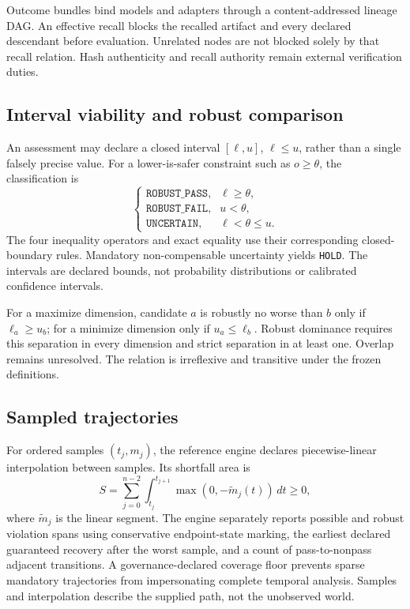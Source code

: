 \documentclass[10pt]{article}
\newcommand{\Hold}{\texttt{HOLD}}
\newcommand{\RPass}{\texttt{ROBUST\_PASS}}
\newcommand{\RFail}{\texttt{ROBUST\_FAIL}}
\newcommand{\Uncertain}{\texttt{UNCERTAIN}}
\begin{document}
Outcome bundles bind models and adapters through a content-addressed lineage
DAG. An effective recall blocks the recalled artifact and every declared
descendant before evaluation. Unrelated nodes are not blocked solely by that
recall relation. Hash authenticity and recall authority remain external
verification duties.

\subsection{Interval viability and robust comparison}

An assessment may declare a closed interval $[\ell,u]$, $\ell\le u$, rather
than a single falsely precise value. For a lower-is-safer constraint such as
$o\ge\theta$, the classification is
\begin{equation}
 \begin{cases}
 \RPass, & \ell\ge\theta,\\
 \RFail, & u<\theta,\\
 \Uncertain, & \ell<\theta\le u.
 \end{cases}
 \label{eq:interval}
\end{equation}
The four inequality operators and exact equality use their corresponding
closed-boundary rules. Mandatory non-compensable uncertainty yields \Hold.
The intervals are declared bounds, not probability distributions or calibrated
confidence intervals.

For a maximize dimension, candidate $a$ is robustly no worse than $b$ only if
$\ell_a\ge u_b$; for a minimize dimension only if $u_a\le\ell_b$. Robust
dominance requires this separation in every dimension and strict separation in
at least one. Overlap remains unresolved. The relation is irreflexive and
transitive under the frozen definitions.

\subsection{Sampled trajectories}

For ordered samples $(t_j,m_j)$, the reference engine declares piecewise-linear
interpolation between samples. Its shortfall area is
\begin{equation}
 S=\sum_{j=0}^{n-2}\int_{t_j}^{t_{j+1}}\max(0,-\widetilde m_j(t))\,dt\ge0,
 \label{eq:shortfall}
\end{equation}
where $\widetilde m_j$ is the linear segment. The engine separately reports
possible and robust violation spans using conservative endpoint-state marking,
the earliest declared guaranteed recovery after the worst sample, and a count
of pass-to-nonpass adjacent transitions. A governance-declared coverage floor
prevents sparse mandatory trajectories from impersonating complete temporal
analysis. Samples and interpolation describe the supplied path, not the
unobserved world.
\end{document}
